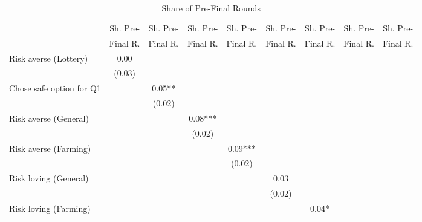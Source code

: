 \begin{table}[htbp]
\centering
\hspace*{-1.2cm}
\begin{threeparttable}
\small
\caption{Share of Pre-Final Rounds}
\label{tab:D4}
\begin{tabular}{l cccccccc}
\hline
\hline
& Sh. Pre- & Sh. Pre- & Sh. Pre- & Sh. Pre- & Sh. Pre- & Sh. Pre- & Sh. Pre- & Sh. Pre- \\
& Final R. & Final R. & Final R. & Final R. & Final R. & Final R. & Final R. & Final R.  \\ \hline
Risk averse (Lottery)&        0.00   &               &               &               &               &               &               &               \\
                    &      (0.03)   &               &               &               &               &               &               &               \\
Chose safe option for Q1&               &        0.05** &               &               &               &               &               &               \\
                    &               &      (0.02)   &               &               &               &               &               &               \\
Risk averse (General)&               &               &        0.08***&               &               &               &               &               \\
                    &               &               &      (0.02)   &               &               &               &               &               \\
Risk averse (Farming)&               &               &               &        0.09***&               &               &               &               \\
                    &               &               &               &      (0.02)   &               &               &               &               \\
Risk loving (General)&               &               &               &               &        0.03   &               &               &               \\
                    &               &               &               &               &      (0.02)   &               &               &               \\
Risk loving (Farming)&               &               &               &               &               &        0.04*  &               &               \\

\end{tabular}
\end{threeparttable}
\end{table}
